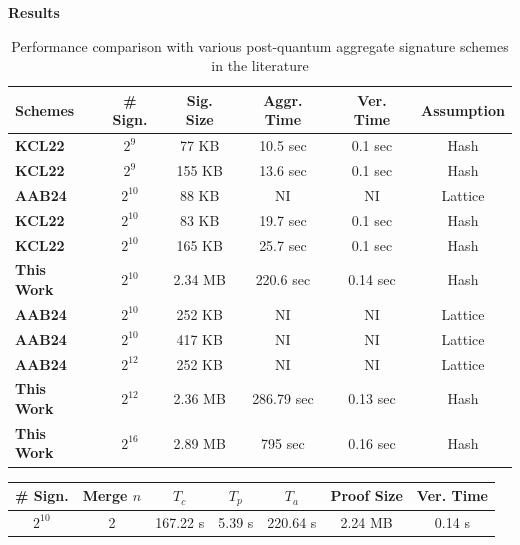 \documentclass[final]{beamer}
\newlength{\colwidth}
\begin{document}
\begin{frame}[t]
\begin{columns}[t]
\begin{column}{\colwidth}
\begin{block}{\fontsize{42}{48}\selectfont\bfseries Results}
\begin{minipage}[t]{0.48\linewidth}
\centering
\vspace*{0.05\textheight}
\begin{table}[H]
\scriptsize
\begin{tabular}{|l|c|c|c|c|c|}
\hline
\textbf{Schemes} & \textbf{\# Sign.} & \textbf{Sig. Size} & \textbf{Aggr. Time} & \textbf{Ver. Time} & \textbf{Assumption} \\
\hline
\textbf{KCL22} \cite{Khaburzaniya2022} & $2^9$ & 77 KB & 10.5 sec & 0.1 sec & Hash \\
\textbf{KCL22} \cite{Khaburzaniya2022} & $2^9$ & 155 KB & 13.6 sec & 0.1 sec & Hash \\
\hline
\textbf{AAB24} \cite{LaBRADOR-Falcon} & $2^{10}$ & 88 KB & NI & NI & Lattice \\
\textbf{KCL22} \cite{Khaburzaniya2022} & $2^{10}$ & 83 KB & 19.7 sec & 0.1 sec & Hash \\
\textbf{KCL22} \cite{Khaburzaniya2022} & $2^{10}$ & 165 KB & 25.7 sec & 0.1 sec & Hash \\
\textbf{This Work} & $2^{10}$ & 2.34 MB & 220.6 sec & 0.14 sec & Hash \\
\textbf{AAB24} \cite{LaBRADOR-Falcon} & $2^{10}$ & 252 KB & NI & NI & Lattice \\
\textbf{AAB24} \cite{LaBRADOR-Falcon} & $2^{10}$ & 417 KB & NI & NI & Lattice \\
\hline
\textbf{AAB24} \cite{LaBRADOR-Falcon} & $2^{12}$ & 252 KB & NI & NI & Lattice \\
\textbf{This Work} & $2^{12}$ & 2.36 MB & 286.79 sec & 0.13 sec & Hash \\
\hline
\textbf{This Work} & $2^{16}$ & 2.89 MB & 795 sec & 0.16 sec & Hash \\
\hline
\end{tabular}
\vskip3mm
\caption{Performance comparison with various post-quantum aggregate signature schemes in the literature}
\label{tab:performanceComparison}
\end{table}
\end{minipage}
\hfill
\begin{minipage}[t]{0.48\linewidth}
\centering
\begin{table}[H]
\scriptsize
\begin{tabular}{|c|c|c|c|c|c|c|}
\hline
\textbf{\# Sign.} & 
\textbf{Merge $n$} & 
$T_c$ & 
$T_p$ & 
$T_a$ & 
\textbf{Proof Size} & 
\textbf{Ver. Time} \\
\hline
$2^{10}$ & 2 & 167.22 s & 5.39 s & 220.64 s & 2.24 MB & 0.14 s \\

\end{tabular}
\end{table}
\end{minipage}
\end{block}
\end{column}
\end{columns}
\end{frame}
\end{document}
